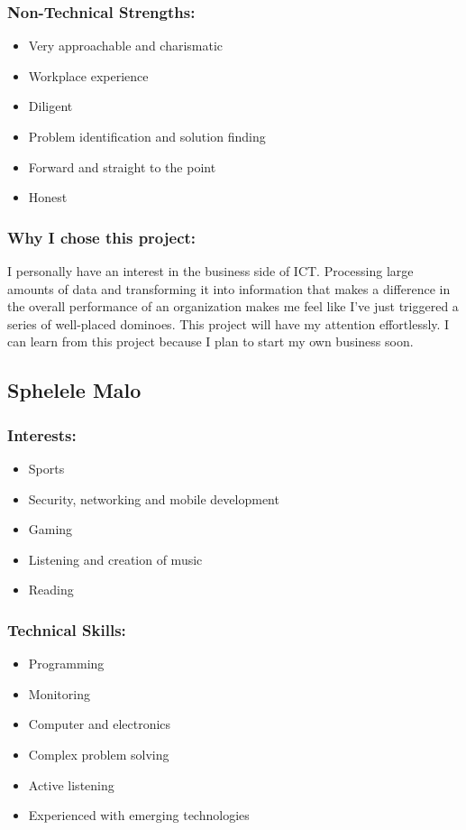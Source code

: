 \subsubsection{Non-Technical Strengths:}
\begin{itemize}
	\item Very approachable and charismatic
	\item Workplace experience
	\item Diligent
	\item Problem identification and solution finding
	\item Forward and straight to the point
	\item Honest
\end{itemize}

\subsubsection{Why I chose this project:}
\par{I personally have an interest in the business side of ICT. Processing large amounts of data and transforming it into information that makes a difference in the overall performance of an organization makes me feel like I've just triggered a series of well-placed dominoes. This project will have my attention effortlessly. I can learn from this project because I plan to start my own business soon.}

\newpage
\subsection{Sphelele Malo}
\subsubsection{Interests:}
	\begin{itemize}
		\item Sports
		\item Security, networking and mobile development
		\item Gaming
		\item Listening and creation of music 
		\item Reading 
	\end{itemize}
\subsubsection{Technical Skills:}
	\begin{itemize}
		\item Programming
		\item Monitoring
		\item Computer and electronics 
		\item Complex problem solving
		\item Active listening
		\item Experienced with emerging technologies 
	\end{itemize}
	
